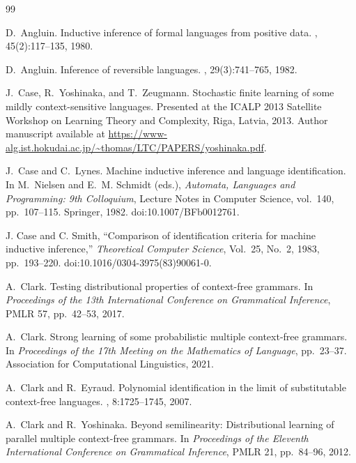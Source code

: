\documentclass[11pt,a4paper]{article}
\numberwithin{equation}{section}
\theoremstyle{plain}
\theoremstyle{definition}
\theoremstyle{remark}
\begin{document}
\begin{thebibliography}{99}

D.~Angluin.
\newblock Inductive inference of formal languages from positive data.
, 45(2):117--135, 1980.

D.~Angluin.
\newblock Inference of reversible languages.
, 29(3):741--765, 1982.

J.~Case, R.~Yoshinaka, and T.~Zeugmann.
\newblock Stochastic finite learning of some mildly context-sensitive languages.
\newblock Presented at the ICALP 2013 Satellite Workshop on Learning Theory and
Complexity, Riga, Latvia, 2013.
\newblock Author manuscript available at
\url{https://www-alg.ist.hokudai.ac.jp/~thomas/LTC/PAPERS/yoshinaka.pdf}.

J.~Case and C.~Lynes.
\newblock Machine inductive inference and language identification.
\newblock In M.~Nielsen and E.~M. Schmidt (eds.), \emph{Automata, Languages
and Programming: 9th Colloquium}, Lecture Notes in Computer Science, vol.~140,
pp.~107--115. Springer, 1982.
\newblock doi:10.1007/BFb0012761.

J. Case and C. Smith,
``Comparison of identification criteria for machine inductive inference,''
\emph{Theoretical Computer Science},
Vol.~25, No.~2, 1983, pp.~193--220.
doi:10.1016/0304-3975(83)90061-0.

A.~Clark.
\newblock Testing distributional properties of context-free grammars.
\newblock In {\em Proceedings of the 13th International Conference on
Grammatical Inference}, PMLR 57, pp.~42--53, 2017.

A.~Clark.
\newblock Strong learning of some probabilistic multiple context-free grammars.
\newblock In {\em Proceedings of the 17th Meeting on the Mathematics of Language},
pp.~23--37. Association for Computational Linguistics, 2021.

A.~Clark and R.~Eyraud.
\newblock Polynomial identification in the limit of substitutable context-free
languages.
, 8:1725--1745, 2007.

A.~Clark and R.~Yoshinaka.
\newblock Beyond semilinearity: Distributional learning of parallel multiple
context-free grammars.
\newblock In {\em Proceedings of the Eleventh International Conference on
Grammatical Inference}, PMLR 21, pp.~84--96, 2012.


\end{thebibliography}
\end{document}
